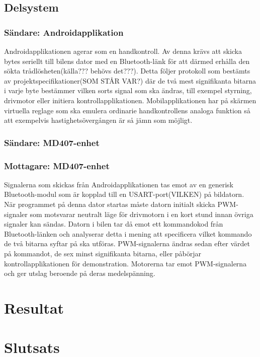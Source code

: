 \documentclass[a4paper]{article}
\begin{document}
\subsection{Delsystem}
\subsubsection{Sändare: Androidapplikation}
Androidapplikationen agerar som en handkontroll. Av denna krävs att skicka bytes seriellt till bilens dator med en Bluetooth-länk för att därmed erhålla den sökta trådlösheten(källa??? behövs det???). Detta följer protokoll som bestämts av projektspecifikationer(SOM STÅR VAR?) där de två mest signifikanta bitarna i varje byte bestämmer vilken sorts signal som ska ändras, till exempel styrning, drivmotor eller initiera kontrollapplikationen. Mobilapplikationen har på skärmen virtuella reglage som ska emulera ordinarie handkontrollens analoga funktion så att exempelvis hastighetsövergången är så jämn som möjligt. 

\subsubsection{Sändare: MD407-enhet}

\subsubsection{Mottagare: MD407-enhet}
Signalerna som skickas från Androidapplikationen tas emot av en generisk Bluetooth-modul som är kopplad till en USART-port(VILKEN) på bildatorn. När programmet på denna dator startas måste datorn initialt skicka PWM-signaler som motsvarar neutralt läge för drivmotorn i en kort stund innan övriga signaler kan sändas. Datorn i bilen tar då emot ett kommandokod från Bluetooth-länken och analyserar detta i mening att specificera vilket kommando de två bitarna syftar på ska utföras. PWM-signalerna ändras sedan efter värdet på kommandot, de sex minst signifikanta bitarna, eller påbörjar kontrollapplikationen för demonstration. Motorerna tar emot PWM-signalerna och ger utslag beroende på deras medelspänning.






\newpage
\section{Resultat}



\newpage
\section{Slutsats}



\newpage


\end{document}
